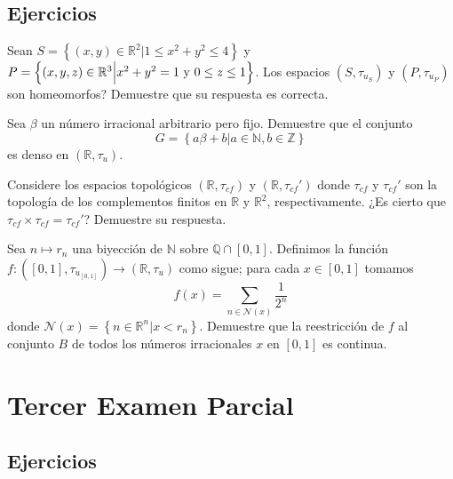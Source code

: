 \documentclass[12pt]{report}
\theoremstyle{largebreak}
\newcommand\cf[3]{\ensuremath{#1:#2\rightarrow#3}}
\begin{document}
    \section{Ejercicios}

    \begin{excer}
        Sean $S=\left\{(x,y)\in\mathbb{R}^2\Big|1\leq x^2+y^2\leq 4 \right\}$ y $P=\left\{(x,y,z)\in\mathbb{R}^3\Big|x^2+y^2=1\textup{ y }0\leq z\leq 1 \right\}$. Los espacios $(S,\tau_{u_S})$ y $(P,\tau_{u_P})$ son homeomorfos? Demuestre que su respuesta es correcta.
    \end{excer}

    \begin{excer}
        Sea $\beta$ un número irracional arbitrario pero fijo. Demuestre que el conjunto 
        \begin{equation*}
            G=\left\{a\beta+b\Big|a\in\mathbb{N},b\in\mathbb{Z} \right\}
        \end{equation*}
        es denso en $(\mathbb{R},\tau_u)$.
    \end{excer}

    \begin{excer}
        Considere los espacios topológicos $(\mathbb{R},\tau_{cf})$ y $(\mathbb{R},\tau_{cf}')$ donde $\tau_{cf}$ y $\tau_{cf}'$ son la topología de los complementos finitos en $\mathbb{R}$ y $\mathbb{R}^2$, respectivamente. ¿Es cierto que $\tau_{cf}\times\tau_{cf}=\tau_{cf}'$? Demuestre su respuesta.
    \end{excer}

    \begin{excer}
        Sea $n\mapsto r_n$ una biyección de $\mathbb{N}$ sobre $\mathbb{Q}\cap [0,1]$. Definimos la función $\cf{f}{([0,1],\tau_{u_{[0,1]}})}{(\mathbb{R},\tau_u)}$ como sigue; para cada $x\in [0,1]$ tomamos 
        \begin{equation*}
            f(x)=\sum_{n\in\mathcal{N}(x) }\frac{1}{2^n}
        \end{equation*}
        donde $\mathcal{N}(x)=\left\{n\in\mathbb{R}^n\Big|x<r_n \right\}$. Demuestre que la reestricción de $f$ al conjunto $B$ de todos los números irracionales $x$ en $[0,1]$ es continua.
    \end{excer}

    \chapter{Tercer Examen Parcial}

    \section{Ejercicios}
    
\end{document}
